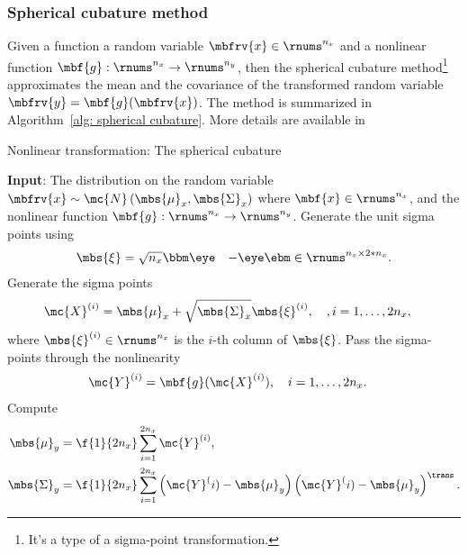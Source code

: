 \subsubsection{Spherical cubature method}
Given a function a random variable $\mbfrv{x}\in\rnums^{n_{x}}$ and a nonlinear function $\mbf{g}:\rnums^{n_{x}}\to\rnums^{n_{y}}$, then the spherical cubature method\footnote{It's a type of a sigma-point transformation.} approximates the mean and the covariance of the transformed random variable $\mbfrv{y}=\mbf{g}(\mbfrv{x})$. The method is summarized in Algorithm~\ref{alg: spherical cubature}. More details are available in \cite{sarkka_bayesian_2013}


\begin{algorithm}
    \caption{Nonlinear transformation: The spherical cubature}
    \label{alg: spherical cubature}
    \begin{algorithmic}[1]
        \State \textbf{Input}: The distribution on the random variable $\mbfrv{x}\sim\mc{N}\left( \mbs{\mu}_{x},\mbs{\Sigma}_{x} \right)$ where $\mbf{x}\in\rnums^{n_{x}}$, and the nonlinear function $\mbf{g}:\rnums^{n_{x}}\to\rnums^{n_{y}}$.
        \State Generate the unit sigma points using
        \begin{align}
            \mbs{\xi} &= \sqrt{n_{x}} \bbm \eye&-\eye \ebm\in\rnums^{n_{x} \times 2*n_{x}}.
        \end{align}
        \State Generate the sigma points
        \begin{align}
            \mc{X}^{(i)} &= \mbs{\mu}_{x} + \sqrt{\mbs{\Sigma}_{x}}\mbs{\xi}^{(i)}, \quad, i=1,\ldots, 2n_{x},
        \end{align}
        where $\mbs{\xi}^{(i)}\in\rnums^{n_{x}}$ is the $i$-th column of $\mbs{\xi}$.
        \State Pass the sigma-points through the nonlinearity
        \begin{align}
            \mc{Y}^{(i)} &= \mbf{g}(\mc{X}^{(i)}), \quad i=1, \ldots, 2n_{x}.
        \end{align}
        \State Compute
        \begin{align}
            \mbs{\mu}_{y} &= \f{1}{2n_{x}}\sum_{i=1}^{2n_{x}}\mc{Y}^{(i)},\\
            \mbs{\Sigma}_{y} &= \f{1}{2n_{x}}\sum_{i=1}^{2n_{x}}\left( \mc{Y}^(i)-\mbs{\mu}_{y} \right)\left( \mc{Y}^(i)-\mbs{\mu}_{y} \right)^{\trans}.
        \end{align}
    \end{algorithmic}
\end{algorithm}




